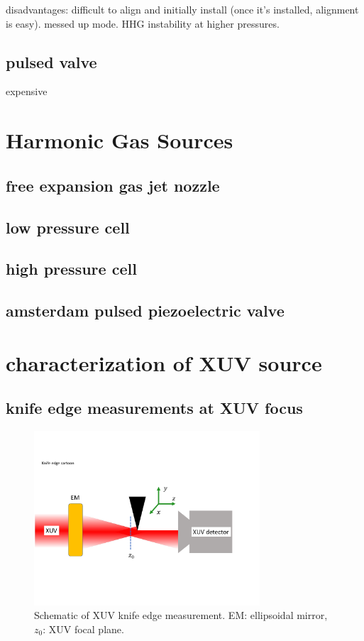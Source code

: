 disadvantages: difficult to align and initially install (once it's installed, alignment is easy). messed up mode. HHG instability at higher pressures.

\subsection{pulsed valve}

expensive





\section{Harmonic Gas Sources}

\subsection{free expansion gas jet nozzle}

\subsection{low pressure cell}

\subsection{high pressure cell}
\label{sec:HPC}

\subsection{amsterdam pulsed piezoelectric valve}

\section{characterization of XUV source}

\subsection{knife edge measurements at XUV focus}

\begin{figure}
	\centering
	\includegraphics[width=0.75\textwidth]{figures/chap3/knife_edge_cartoon.pdf}
	\caption{Schematic of XUV knife edge measurement. EM: ellipsoidal mirror, $z_0$: XUV focal plane.}
	\label{fig:knife_edge_cartoon}
\end{figure}

